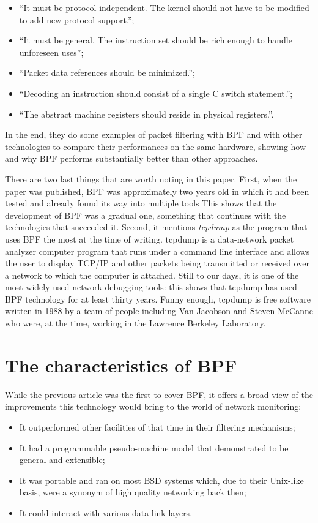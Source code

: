 \begin{itemize}
	\item 
		``It must be protocol independent. The kernel should not have to be modified to add new protocol support.'';
	\item 
		``It must be general. The instruction set should be rich enough to handle unforeseen uses'';
	\item 
		``Packet data references should be minimized.'';
	\item 
		``Decoding an instruction should consist of a single C switch statement.'';
	\item 
		``The abstract machine registers should reside in physical registers.''.
\end{itemize}

In the end, they do some examples of packet filtering with BPF and with other technologies to compare their performances on the same hardware, showing how and why BPF performs substantially better than other approaches.

There are two last things that are worth noting in this paper.
First, when the paper was published, BPF was approximately two years old in which it had been tested and already found its way into multiple tools
This shows that the development of BPF was a gradual one, something that continues with the technologies that succeeded it.
Second, it mentions \textit{tcpdump} as the program that uses BPF the most at the time of writing.
tcpdump is a data-network packet analyzer computer program that runs under a command line interface and allows the user to display TCP/IP and other packets being transmitted or received over a network to which the computer is attached.
Still to our days, it is one of the most widely used network debugging tools: this shows that tcpdump has used BPF technology for at least thirty years.
Funny enough, tcpdump is free software written in 1988 by a team of people including Van Jacobson and Steven McCanne who were, at the time, working in the Lawrence Berkeley Laboratory.

\section{The characteristics of BPF}

While the previous article was the first to cover BPF, it offers a broad view of the improvements this technology would bring to the world of network monitoring:

\begin{itemize}
	\item 
		It outperformed other facilities of that time in their filtering mechanisms;
	\item 
		It had a programmable pseudo-machine model that demonstrated to be general and extensible;
	\item 
		It was portable and ran on most BSD systems which, due to their Unix-like basis, were a synonym of high quality networking back then;
	\item 
		It could interact with various data-link layers.
\end{itemize}

